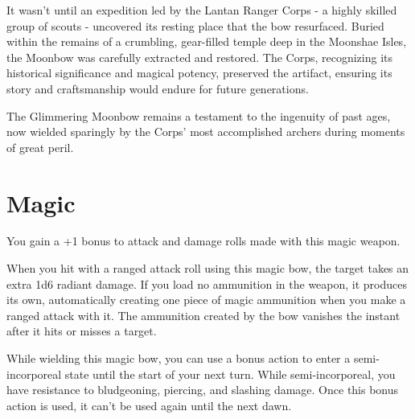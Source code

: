 It wasn't until an expedition led by the Lantan Ranger Corps - a highly skilled group of scouts - uncovered its resting place that the bow resurfaced. Buried within the remains of a crumbling, gear-filled temple deep in the Moonshae Isles, the Moonbow was carefully extracted and restored. The Corps, recognizing its historical significance and magical potency, preserved the artifact, ensuring its story and craftsmanship would endure for future generations.

The Glimmering Moonbow remains a testament to the ingenuity of past ages, now wielded sparingly by the Corps' most accomplished archers during moments of great peril.

\section*{Magic}
You gain a +1 bonus to attack and damage rolls made with this magic weapon.

When you hit with a ranged attack roll using this magic bow, the target takes an extra 1d6 radiant damage. If you load no ammunition in the weapon, it produces its own, automatically creating one piece of magic ammunition when you make a ranged attack with it. The ammunition created by the bow vanishes the instant after it hits or misses a target.

While wielding this magic bow, you can use a bonus action to enter a semi-incorporeal state until the start of your next turn. While semi-incorporeal, you have resistance to bludgeoning, piercing, and slashing damage. Once this bonus action is used, it can't be used again until the next dawn.